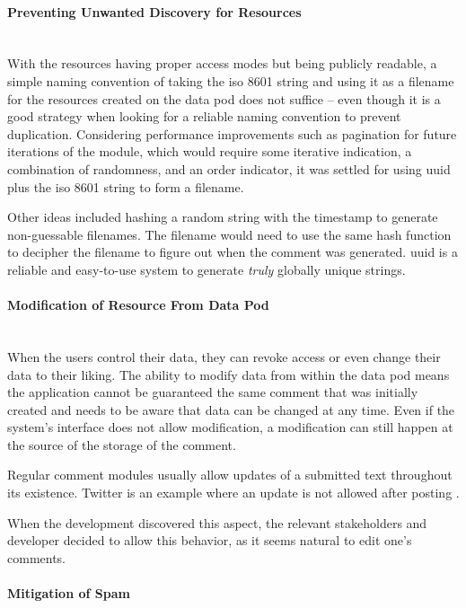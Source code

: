 \paragraph{Preventing Unwanted Discovery for Resources}\mbox{}\\

With the resources having proper access modes but being publicly readable, a simple naming convention of taking the \gls{iso} 8601 string and using it as a filename for the resources created on the data pod does not suffice -- even though it is a good strategy when looking for a reliable naming convention to prevent duplication. 
Considering performance improvements such as pagination for future iterations of the module, which would require some iterative indication, a combination of randomness, and an order indicator, it was settled for using \gls{uuid} plus the \gls{iso} 8601 string to form a filename.

Other ideas included hashing a random string with the timestamp to generate non-guessable filenames. The filename would need to use the same hash function to decipher the filename to figure out when the comment was generated. \gls{uuid} is a reliable and easy-to-use system to generate \textit{truly} globally unique strings. 
\vspace{0.5cm}
\paragraph{Modification of Resource From Data Pod}\mbox{}\\

When the users control their data, they can revoke access or even change their data to their liking. The ability to modify data from within the data pod means the application cannot be guaranteed the same comment that was initially created and needs to be aware that data can be changed at any time. Even if the system's interface does not allow modification, a modification can still happen at the source of the storage of the comment.

Regular comment modules usually allow updates of a submitted text throughout its existence. Twitter is an example where an update is not allowed after posting \cite{twitter-edit}. 

When the development discovered this aspect, the relevant stakeholders and developer decided to allow this behavior, as it seems natural to edit one's comments.

\vspace{0.5cm}
\paragraph{Mitigation of Spam}\mbox{}\\

